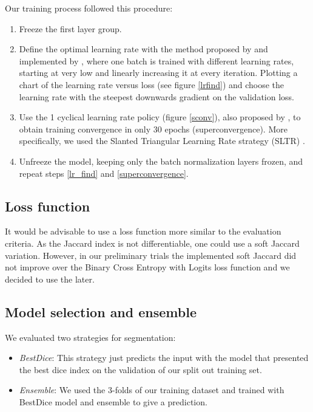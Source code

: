 \documentclass{article}
\begin{document}
Our training process followed this procedure:
\begin{enumerate}
  \item Freeze the first layer group.
  \item \label{lr_find}Define the optimal learning rate with the method proposed by \cite{leslie} and implemented by \cite{fastai}, where one batch is trained with different learning rates, starting at very low and linearly increasing it at every iteration. Plotting a chart of the learning rate versus loss (see figure \ref{lrfind}) and choose the learning
    rate with the steepest downwards gradient on the validation loss.
  \item \label{superconvergence}Use the 1 cyclical learning rate policy (figure \ref{sconv}), also proposed by \cite{leslie}, to obtain training convergence in only 30 epochs (superconvergence). More specifically, we used the Slanted Triangular Learning Rate strategy (SLTR) \cite{howard_ruder_acl2018}.
  \item Unfreeze the model, keeping only the batch normalization layers frozen, and repeat steps \ref{lr_find} and \ref{superconvergence}.
\end{enumerate}

\subsection{Loss function}
It would be advisable to use a loss function more similar to the evaluation criteria. As the Jaccard index is not differentiable,
one could use a soft Jaccard variation\cite{iglovikov}.
However, in our preliminary trials the implemented soft Jaccard did not improve over the Binary Cross Entropy with Logits loss function and we decided to use the later. 

\subsection{Model selection and ensemble}
We evaluated two strategies for segmentation:
\begin{itemize}
\item \emph{BestDice}: This strategy just predicts the input with the model that presented the best dice index on the validation of our split out training set.
\item \emph{Ensemble}: We used the 3-folds of our training dataset and trained with BestDice model and ensemble to give a prediction.
\end{itemize}
\end{document}
